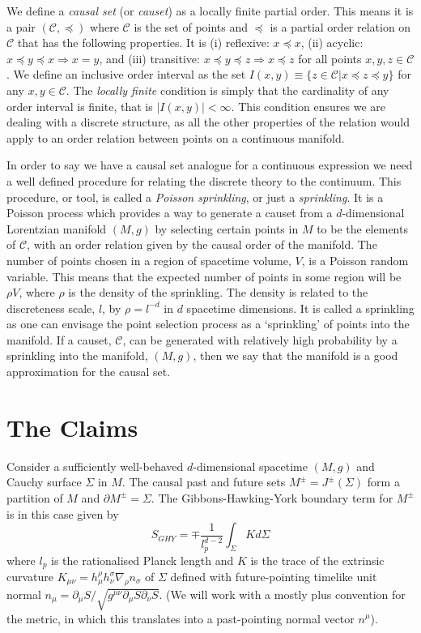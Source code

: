 \documentclass[12pt]{article}
\newcommand{\be}{\begin{equation}}
\newcommand{\ee}{\end{equation}}
\newcommand{\mb}[1]{\marginnote{\color{red}{\small MB:\,#1}}}
\begin{document}
We define a \textit{causal set} (or \textit{causet}) as a locally finite partial order. This means it is a pair $(\mathcal{C},\preceq)$ where $\mathcal{C}$ is the set of points and $\preceq$ is a partial order relation on $\mathcal{C}$ that has the following properties. It is (i) reflexive: $x\preceq x$, (ii) acyclic: $x\preceq y\preceq x \Rightarrow x=y$, and (iii) transitive: $x\preceq y\preceq z \Rightarrow x\preceq z$ for all points $x, y, z \in \mathcal{C}$. We define an inclusive order interval as the set $I(x,y)\equiv \lbrace z\in\mathcal{C}|x\preceq z\preceq y\rbrace$ for any $x, y\in\mathcal{C}$. The \textit{locally finite} condition is simply that the cardinality of any order interval is finite, that is $|I(x,y)|<\infty$. This condition ensures we are dealing with a discrete structure, as all the other properties of the relation would apply to an order relation between points on a continuous manifold.

In order to say we have a causal set analogue for a continuous expression we need a well defined procedure for relating the discrete theory to the continuum. This procedure, or tool, is called a \textit{Poisson sprinkling}, or just a \textit{sprinkling}. It is a Poisson process which provides a way to generate a causet from a $d$-dimensional Lorentzian manifold $(M,g)$ by selecting certain points in $M$ to be the elements of $\mathcal{C}$, with an order relation given by the causal order of the manifold. The number of points chosen in a region of spacetime volume, $V$, is a Poisson random variable. This means that the expected number of points in some region will be $\rho V$, where $\rho$ is the density of the sprinkling. The density is related to the discreteness scale, $l$, by $\rho=l^{-d}$ in $d$ spacetime dimensions. It is called a sprinkling as one can envisage the point selection process as a `sprinkling' of points into the manifold. If a causet, $\mathcal{C}$, can be generated with relatively high probability by a sprinkling into the manifold, $(M,g)$, then we say that the manifold is a good approximation for the causal set.

\section{The Claims}

Consider a sufficiently well-behaved $d$-dimensional spacetime $(M,g)$ and Cauchy surface $\Sigma$ in $M$. The causal past and future sets $M^\pm=J^\pm(\Sigma)$ form a partition of $M$ and $\partial M^\pm = \Sigma$. The Gibbons-Hawking-York boundary term for $M^\pm$ is in this case given by
\be\label{eq:GHYBT_in_continuum}
S_{GHY} = \mp \frac{1}{l_p^{d-2}}\int_{\Sigma} K d\Sigma
\ee
where $l_p$ is the rationalised Planck length and $K$ is the trace of the extrinsic curvature $K_{\mu\nu}=h_{\mu}^\rho h_\nu^\sigma \nabla_\rho n_\sigma$ of $\Sigma$ defined with future-pointing timelike unit normal $n_{\mu}=\partial_\mu S/\sqrt{g^{\mu\nu}\partial_\mu S\partial_\nu S}$. (We will work with a mostly plus convention for the metric, in which this translates into a past-pointing normal vector $n^{\mu}$).\mb{ok or more detail on conventions needed?}
\end{document}
